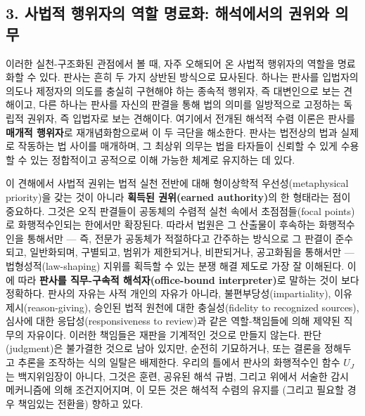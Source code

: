 \documentclass[12pt,a4paper]{article}
\begin{document}
\subsection{3. 사법적 행위자의 역할 명료화: 해석에서의 권위와
의무}

이러한 실천-구조화된 관점에서 볼 때, 자주 오해되어 온 사법적 행위자의
역할을 명료화할 수 있다. 판사는 흔히 두 가지 상반된 방식으로 묘사된다.
하나는 판사를 입법자의 의도나 제정자의 의도를 충실히 구현해야 하는
\textsf{종속적 행위자}, 즉 대변인으로 보는 견해이고, 다른 하나는 판사를
자신의 판결을 통해 법의 의미를 일방적으로 고정하는 \textsf{독립적 권위자},
즉 입법자로 보는 견해이다. 여기에서 전개된 해석적 수렴 이론은 판사를
\textbf{매개적 행위자}로 재개념화함으로써 이 두 극단을 해소한다. 판사는
법전상의 법과 실제로 작동하는 법 사이를 매개하며, 그 최상위 의무는 법을
타자들이 신뢰할 수 있게 수용할 수 있는 정합적이고 공적으로 이해 가능한
체계로 유지하는 데 있다.

이 견해에서 사법적 권위는 법적 실천 전반에 대해 형이상학적
우선성(metaphysical priority)을 갖는 것이 아니라 \textbf{획득된
권위(earned authority)}의 한 형태라는 점이 중요하다. 그것은 오직
판결들이 공동체의 수렴적 실천 속에서 초점점들(focal points)로
화행적수인되는 한에서만 확장된다. 따라서 법원은 그 산출물이 후속하는
화행적수인을 통해서만 --- 즉, 전문가 공동체가 적절하다고 간주하는
방식으로 그 판결이 준수되고, 일반화되며, 구별되고, 범위가 제한되거나,
비판되거나, 공고화됨을 통해서만 --- 법형성적(law-shaping) 지위를 획득할
수 있는 분쟁 해결 제도로 가장 잘 이해된다. 이에 따라 \textbf{판사를
직무-구속적 해석자(office-bound interpreter)}로 말하는 것이 보다
정확하다. 판사의 자유는 사적 개인의 자유가 아니라,
불편부당성(impartiality), 이유제시(reason-giving), 승인된 법적 원천에
대한 충실성(fidelity to recognized sources), 심사에 대한
응답성(responsiveness to review)과 같은 \textsf{역할-책임들에 의해 제약된}
직무의 자유이다. 이러한 책임들은 재판을 기계적인 것으로 만들지 않는다.
판단(judgment)은 불가결한 것으로 남아 있지만, 순전히 기묘하거나, 또는
결론을 정해두고 추론을 조작하는 식의 일탈은 배제한다. 우리의 틀에서
판사의 화행적수인 함수 \(U_J\)는 백지위임장이 아니다, 그것은 훈련,
공유된 해석 규범, 그리고 위에서 서술한 감시 메커니즘에 의해
조건지어지며, 이 모든 것은 해석적 수렴의 유지를 (그리고 필요할 경우
책임있는 전환을) 향하고 있다.
\end{document}
